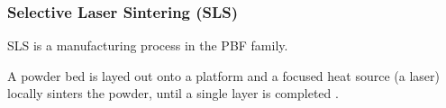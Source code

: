 \documentclass{article}
\begin{document}
%
%
%
%

    \subsubsection{Selective Laser Sintering (SLS) \label{SLS_general}}

    SLS is a manufacturing process in the PBF family. 

    A powder bed is layed out onto a platform and a focused heat source (a laser) locally sinters the powder, 
    until a single layer is completed \autocites*{Recent_progress_polymers_AM}{Kovalcik_PHA_Review}. 
\end{document}

